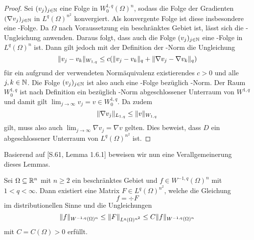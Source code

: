 \begin{proof}
  Sei $(v_j)_{j \in \mathbb{N}}$ eine Folge in $W_0^{1,q}(\Omega)^n$, sodass die Folge der Gradienten $(\nabla v_j)_{j \in \mathbb{N}}$ in $L^q(\Omega)^{n^2}$ konvergiert.
  Als konvergente Folge ist diese insbesondere eine \cauchy\hyp{}Folge.
  Da $\Omega$ nach Voraussetzung ein beschränktes Gebiet ist, lässt sich die \poincare\hyp{}Ungleichung anwenden.
  Daraus folgt, dass auch die Folge $(v_j)_{j \in \mathbb{N}}$ eine \cauchy\hyp{}Folge in $L^q(\Omega)^n$ ist.
  Dann gilt jedoch mit der Definition der \sobolev\hyp{}Norm die Ungleichung
  $$
  \lVert v_j - v_k \rVert_{W_{1,q}} \leq c (\lVert v_j - v_k \rVert_q + \lVert \nabla v_j - \nabla v_k \rVert_q)
  $$
  für ein aufgrund der verwendeten Normäquivalenz existierendes $c > 0$ und alle $j,k \in \mathbb{N}$.
  Die Folge $(v_j)_{j \in \mathbb{N}}$ ist also auch eine \cauchy\hyp{}Folge bezüglich \sobolev\hyp{}Norm.
  Der Raum $W_0^{1,q}$ ist nach Definition ein bezüglich \sobolev\hyp{}Norm abgeschlossener Unterraum von $W^{1,q}$ und damit gilt $\lim_{j \to \infty} v_j = v \in W_0^{1,q}$.
  Da zudem
  $$
  \lVert \nabla v_j \rVert_{L_{1,q}} \leq \lVert v \rVert_{W_{1,q}}  
  $$
  gilt, muss also auch $\lim_{j \to \infty} \nabla v_j = \nabla v$ gelten.
  Dies beweist, dass $D$ ein abgeschlossener Unterraum von $L^q(\Omega)^{n^2}$ ist.
\end{proof}

Basierend auf \cite{sohr2001navier}[S.61, Lemma 1.6.1] beweisen wir nun eine Verallgemeinerung dieses Lemmas. 

\begin{lem}
  \label{lem:divRepresentation}
  Sei $\Omega \subseteq \mathbb{R}^n$ mit $n \geq 2$ ein beschränktes Gebiet und $f \in W^{-1,q}(\Omega)^n$ mit $1 < q < \infty$.
  Dann existiert eine Matrix $F \in L^q(\Omega)^{n^2}$, welche die Gleichung
  $$ f = \div F $$
  im distributionellen Sinne und die Ungleichungen
  $$
  \lVert  f  \rVert_{W^{-1,q}(\Omega)^n} 
  \leq \lVert  F  \rVert_{L^q(\Omega)^{n^2}} 
  \leq C \lVert  f  \rVert_{W^{-1,q}(\Omega)^n}
  $$
  mit $C = C(\Omega) > 0$ erfüllt.
\end{lem}

